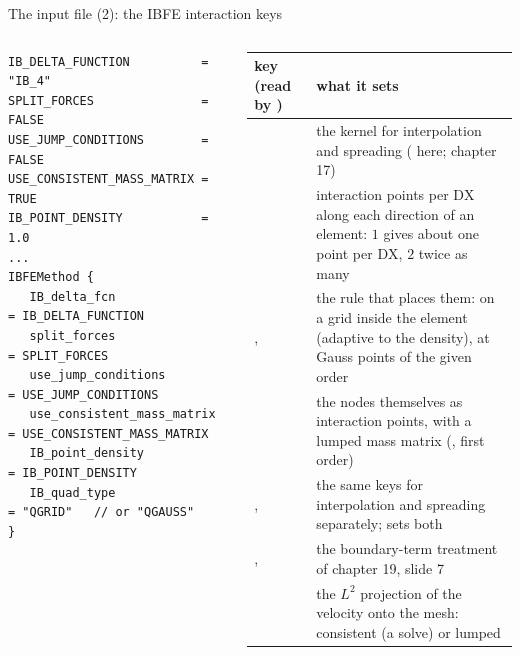 \documentclass[aspectratio=169,11pt]{beamer}
\begin{document}
\begin{frame}[fragile]{The input file (2): the IBFE interaction keys}
\label{fr:input2}
\footnotesize
\begin{columns}[T]
\begin{lstlisting}[style=inputtiny]
IB_DELTA_FUNCTION          = "IB_4"
SPLIT_FORCES               = FALSE
USE_JUMP_CONDITIONS        = FALSE
USE_CONSISTENT_MASS_MATRIX = TRUE
IB_POINT_DENSITY           = 1.0
...
IBFEMethod {
   IB_delta_fcn               = IB_DELTA_FUNCTION
   split_forces               = SPLIT_FORCES
   use_jump_conditions        = USE_JUMP_CONDITIONS
   use_consistent_mass_matrix = USE_CONSISTENT_MASS_MATRIX
   IB_point_density           = IB_POINT_DENSITY
   IB_quad_type               = "QGRID"   // or "QGAUSS"
}
\end{lstlisting}
\scriptsize
\setlength{\tabcolsep}{3pt}
\begin{tabular}{@{}L{0.36\textwidth}L{0.6\textwidth}@{}}
\toprule
key (read by ) & what it sets \\
\midrule
{} & the kernel for interpolation and spreading ( here; chapter 17) \\
 & interaction points per $\mathrm{DX}$ along each direction of an element: $1$ gives about one point per $\mathrm{DX}$, $2$ twice as many \\
,  & the rule that places them:  on a grid inside the element (adaptive to the density),  at Gauss points of the given order \\
\newline{} & the nodes themselves as interaction points, with a lumped mass matrix (, first order) \\
,  & the same keys for interpolation and spreading separately;  sets both \\
,\newline{} & the boundary-term treatment of chapter 19, slide 7 \\
\newline{} & the $L^2$ projection of the velocity onto the mesh: consistent (a solve) or lumped \\
\bottomrule
\end{tabular}
\end{columns}
\end{frame}
\end{document}

